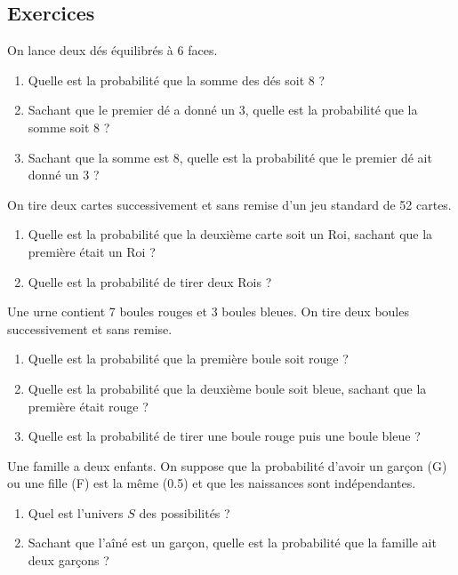 


\subsection{Exercices}


\begin{exercicebox}
On lance deux dés équilibrés à 6 faces.
\begin{enumerate}
    \item Quelle est la probabilité que la somme des dés soit 8 ?
    \item Sachant que le premier dé a donné un 3, quelle est la probabilité que la somme soit 8 ?
    \item Sachant que la somme est 8, quelle est la probabilité que le premier dé ait donné un 3 ?
\end{enumerate}
\end{exercicebox}

\begin{exercicebox}
On tire deux cartes successivement et sans remise d'un jeu standard de 52 cartes.
\begin{enumerate}
    \item Quelle est la probabilité que la deuxième carte soit un Roi, sachant que la première était un Roi ?
    \item Quelle est la probabilité de tirer deux Rois ?
\end{enumerate}
\end{exercicebox}

\begin{exercicebox}
Une urne contient 7 boules rouges et 3 boules bleues. On tire deux boules successivement et sans remise.
\begin{enumerate}
    \item Quelle est la probabilité que la première boule soit rouge ?
    \item Quelle est la probabilité que la deuxième boule soit bleue, sachant que la première était rouge ?
    \item Quelle est la probabilité de tirer une boule rouge puis une boule bleue ?
\end{enumerate}
\end{exercicebox}

\begin{exercicebox}
Une famille a deux enfants. On suppose que la probabilité d'avoir un garçon (G) ou une fille (F) est la même (0.5) et que les naissances sont indépendantes.
\begin{enumerate}
    \item Quel est l'univers $S$ des possibilités ?
    \item Sachant que l'aîné est un garçon, quelle est la probabilité que la famille ait deux garçons ?
\end{enumerate}
\end{exercicebox}

